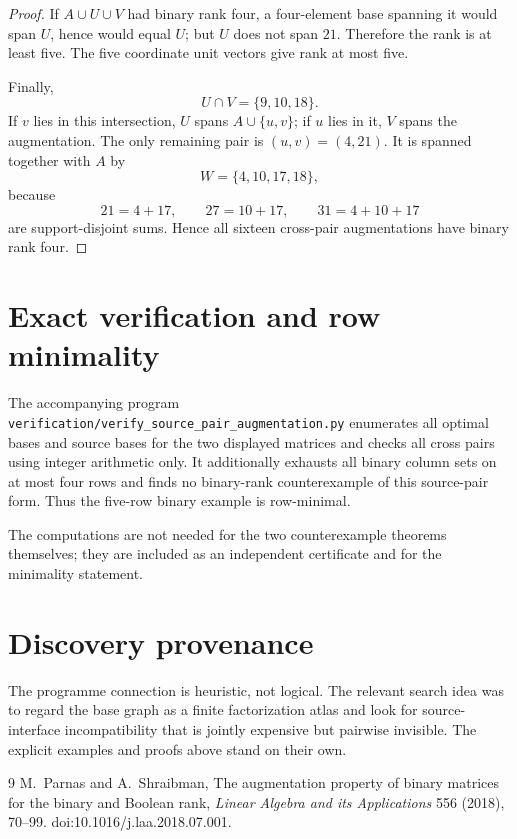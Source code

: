\documentclass[11pt]{article}
\begin{document}
\begin{proof}
If $A\cup U\cup V$ had binary rank four, a four-element base spanning it would span $U$, hence would equal $U$; but $U$ does not span $21$. Therefore the rank is at least five. The five coordinate unit vectors give rank at most five.

Finally,
\[
U\cap V=\{9,10,18\}.
\]
If $v$ lies in this intersection, $U$ spans $A\cup\{u,v\}$; if $u$ lies in it, $V$ spans the augmentation. The only remaining pair is $(u,v)=(4,21)$. It is spanned together with $A$ by
\[
W=\{4,10,17,18\},
\]
because
\[
21=4+17,
\qquad
27=10+17,
\qquad
31=4+10+17
\]
are support-disjoint sums. Hence all sixteen cross-pair augmentations have binary rank four.
\end{proof}

\section{Exact verification and row minimality}

The accompanying program \texttt{verification/verify\_source\_pair\_augmentation.py} enumerates all optimal bases and source bases for the two displayed matrices and checks all cross pairs using integer arithmetic only. It additionally exhausts all binary column sets on at most four rows and finds no binary-rank counterexample of this source-pair form. Thus the five-row binary example is row-minimal.

The computations are not needed for the two counterexample theorems themselves; they are included as an independent certificate and for the minimality statement.

\section{Discovery provenance}

The programme connection is heuristic, not logical. The relevant search idea was to regard the base graph as a finite factorization atlas and look for source-interface incompatibility that is jointly expensive but pairwise invisible. The explicit examples and proofs above stand on their own.

\begin{thebibliography}{9}
M.~Parnas and A.~Shraibman,
\newblock The augmentation property of binary matrices for the binary and Boolean rank,
\newblock \emph{Linear Algebra and its Applications} 556 (2018), 70--99.
\newblock doi:10.1016/j.laa.2018.07.001.
\end{thebibliography}
\end{document}

